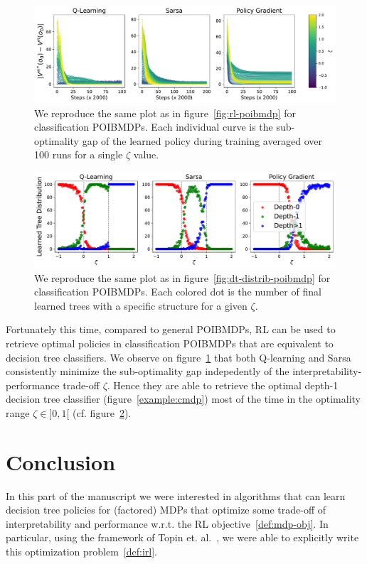 \begin{figure}
    \centering
    \includegraphics[width=1\textwidth]{images/images_part1/learning_curves_classif.pdf}
    \caption{We reproduce the same plot as in figure~\ref{fig:rl-poibmdp} for classification POIBMDPs. Each individual curve is the sub-optimality gap of the learned policy during training averaged over 100 runs for a single $\zeta$ value.}\label{fig:rl-classif-poibmdp}
\end{figure}

\begin{figure}
    \centering
    \includegraphics[width=1\textwidth]{images/images_part1/tree_distributions_classif.pdf}
    \caption{We reproduce the same plot as in figure~\ref{fig:dt-distrib-poibmdp} for classification POIBMDPs. Each colored dot is the number of final learned trees with a specific structure for a given $\zeta$.}\label{fig:tree-distrib-classif-poibmdp}
\end{figure}

Fortunately this time, compared to general POIBMDPs, RL can be used to retrieve optimal policies in classification POIBMDPs that are equivalent to decision tree classifiers.
We observe on figure~\ref{fig:rl-classif-poibmdp} that both Q-learning and Sarsa consistently minimize the sub-optimality gap indepedently of the interpretability-performance trade-off $\zeta$. 
Hence they are able to retrieve the optimal depth-1 decision tree classifier (figure~\ref{example:cmdp}) most of the time in the optimality range $\zeta\in ]0, 1[$ (cf. figure~\ref{fig:tree-distrib-classif-poibmdp}).


\section{Conclusion}
In this part of the manuscript we were interested in algorithms that can learn decision tree policies for (factored) MDPs that optimize some trade-off of interpretability and performance w.r.t. the RL objective~\ref{def:mdp-obj}.
In particular, using the framework of Topin et. al.~\cite{topin2021iterative}, we were able to explicitly write this optimization problem~\ref{def:irl}.

